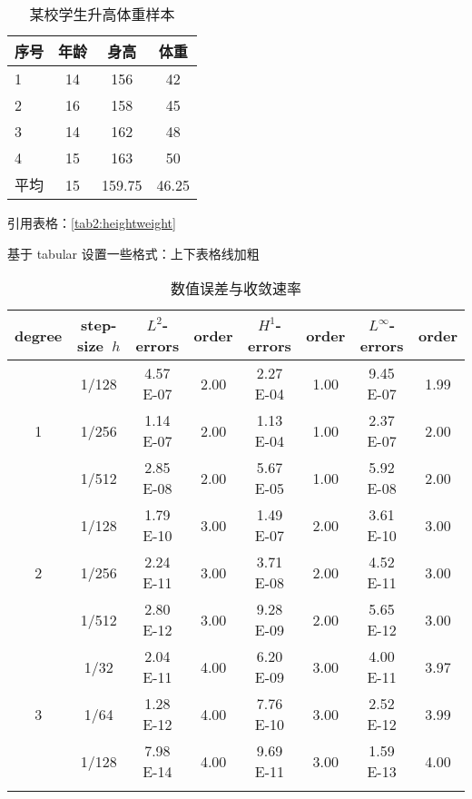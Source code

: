 \documentclass{shnuthesis}
\begin{document}
\begin{table}[!htp]
\centering
\caption{某校学生升高体重样本}
\label{tab2:heightweight}
\begin{tabularx}{0.9\textwidth}{lCCC}
   \toprule
	序号&年龄&身高&体重\\
	&14&156&42\\
	2&16&158&45\\
	3&14&162&48\\
	4&15&163&50\\
	平均&15&159.75&46.25\\
	\bottomrule
\end{tabularx}
\end{table}

引用表格：\autoref{tab2:heightweight}

\clearpage
基于 tabular 设置一些格式：上下表格线加粗

\begin{table}[!htp]
\centering
\caption{数值误差与收敛速率}
\renewcommand\arraystretch{1.2} %
\label{table1}
\begin{tabular}{c|c|cc|cc|cc}
\Xhline{2\arrayrulewidth}
degree &  step-size~$h$  & $L^2$-errors  &  order  & $H^1$-errors & order & $L^\infty$-errors  &  order \\
\hline
   &  1/128     & 4.57 E-07    &2.00     & 2.27 E-04  &1.00          & 9.45 E-07   &1.99    \\
1  &  1/256    & 1.14 E-07     &2.00    & 1.13 E-04  &1.00          & 2.37 E-07   &2.00      \\
   &  1/512    & 2.85 E-08     &2.00    & 5.67 E-05  &1.00          & 5.92 E-08   &2.00       \\
\hline  %
   &  1/128    & 1.79 E-10    &3.00      & 1.49 E-07  &2.00            & 3.61 E-10  &3.00       \\
2  &  1/256     & 2.24 E-11     &3.00       & 3.71 E-08  &2.00         & 4.52 E-11   &3.00      \\
   &  1/512     & 2.80 E-12     &3.00       & 9.28 E-09  &2.00        & 5.65 E-12   &3.00     \\
\hline  %
   &  1/32      & 2.04 E-11    &4.00      & 6.20 E-09  &3.00           & 4.00 E-11   &3.97       \\
3  &  1/64     & 1.28 E-12     &4.00     & 7.76 E-10  &3.00           & 2.52 E-12   &3.99       \\
   &  1/128     & 7.98 E-14     &4.00     & 9.69 E-11  &3.00           & 1.59 E-13   &4.00       \\
\Xhline{2\arrayrulewidth}
\end{tabular}
\end{table}
\end{document}
